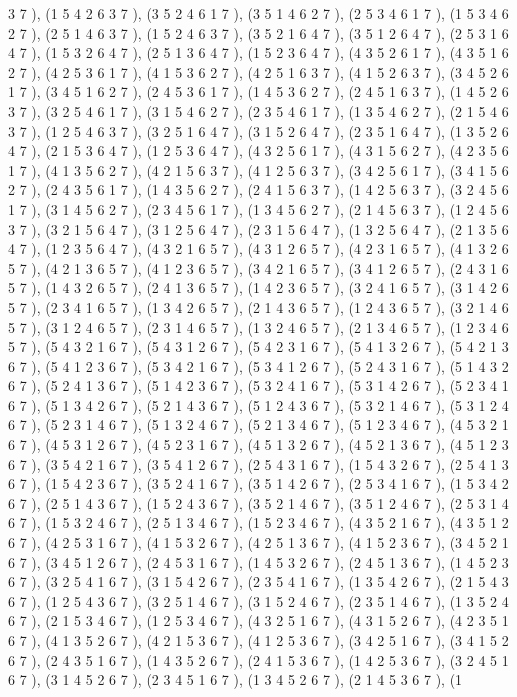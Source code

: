 \documentclass[12pt]{article}
\begin{document}
\begin{enumerate}
3 7  ), (1 5 4 2 6 3 7  ), (3 5 2 4 6 1 7  ), (3 5 1 4 6 2 7  ), (2 5 3 4 6 1 7  ), (1 5 3 4 6 2 7  ), (2 5 1 4 6 3 7  ), (1 5 2 4 6 3 7  ), (3 5 2 1 6 4 7  ), (3 5 1 2 6 4 7  ), (2 5 3 1 6 4 7  ), (1 5 3 2 6 4 7  ), (2 5 1 3 6 4 7  ), (1 5 2 3 6 4 7  ), (4 3 5 2 6 1 7  ), (4 3 5 1 6 2 7  ), (4 2 5 3 6 1 7  ), (4 1 5 3 6 2 7  ), (4 2 5 1 6 3 7  ), (4 1 5 2 6 3 7  ), (3 4 5 2 6 1 7  ), (3 4 5 1 6 2 7  ), (2 4 5 3 6 1 7  ), (1 4 5 3 6 2 7  ), (2 4 5 1 6 3 7  ), (1 4 5 2 6 3 7  ), (3 2 5 4 6 1 7  ), (3 1 5 4 6 2 7  ), (2 3 5 4 6 1 7  ), (1 3 5 4 6 2 7  ), (2 1 5 4 6 3 7  ), (1 2 5 4 6 3 7  ), (3 2 5 1 6 4 7  ), (3 1 5 2 6 4 7  ), (2 3 5 1 6 4 7  ), (1 3 5 2 6 4 7  ), (2 1 5 3 6 4 7  ), (1 2 5 3 6 4 7  ), (4 3 2 5 6 1 7  ), (4 3 1 5 6 2 7  ), (4 2 3 5 6 1 7  ), (4 1 3 5 6 2 7  ), (4 2 1 5 6 3 7  ), (4 1 2 5 6 3 7  ), (3 4 2 5 6 1 7  ), (3 4 1 5 6 2 7  ), (2 4 3 5 6 1 7  ), (1 4 3 5 6 2 7  ), (2 4 1 5 6 3 7  ), (1 4 2 5 6 3 7  ), (3 2 4 5 6 1 7  ), (3 1 4 5 6 2 7  ), (2 3 4 5 6 1 7  ), (1 3 4 5 6 2 7  ), (2 1 4 5 6 3 7  ), (1 2 4 5 6 3 7  ), (3 2 1 5 6 4 7  ), (3 1 2 5 6 4 7  ), (2 3 1 5 6 4 7  ), (1 3 2 5 6 4 7  ), (2 1 3 5 6 4 7  ), (1 2 3 5 6 4 7  ), (4 3 2 1 6 5 7  ), (4 3 1 2 6 5 7  ), (4 2 3 1 6 5 7  ), (4 1 3 2 6 5 7  ), (4 2 1 3 6 5 7  ), (4 1 2 3 6 5 7  ), (3 4 2 1 6 5 7  ), (3 4 1 2 6 5 7  ), (2 4 3 1 6 5 7  ), (1 4 3 2 6 5 7  ), (2 4 1 3 6 5 7  ), (1 4 2 3 6 5 7  ), (3 2 4 1 6 5 7  ), (3 1 4 2 6 5 7  ), (2 3 4 1 6 5 7  ), (1 3 4 2 6 5 7  ), (2 1 4 3 6 5 7  ), (1 2 4 3 6 5 7  ), (3 2 1 4 6 5 7  ), (3 1 2 4 6 5 7  ), (2 3 1 4 6 5 7  ), (1 3 2 4 6 5 7  ), (2 1 3 4 6 5 7  ), (1 2 3 4 6 5 7  ), (5 4 3 2 1 6 7  ), (5 4 3 1 2 6 7  ), (5 4 2 3 1 6 7  ), (5 4 1 3 2 6 7  ), (5 4 2 1 3 6 7  ), (5 4 1 2 3 6 7  ), (5 3 4 2 1 6 7  ), (5 3 4 1 2 6 7  ), (5 2 4 3 1 6 7  ), (5 1 4 3 2 6 7  ), (5 2 4 1 3 6 7  ), (5 1 4 2 3 6 7  ), (5 3 2 4 1 6 7  ), (5 3 1 4 2 6 7  ), (5 2 3 4 1 6 7  ), (5 1 3 4 2 6 7  ), (5 2 1 4 3 6 7  ), (5 1 2 4 3 6 7  ), (5 3 2 1 4 6 7  ), (5 3 1 2 4 6 7  ), (5 2 3 1 4 6 7  ), (5 1 3 2 4 6 7  ), (5 2 1 3 4 6 7  ), (5 1 2 3 4 6 7  ), (4 5 3 2 1 6 7  ), (4 5 3 1 2 6 7  ), (4 5 2 3 1 6 7  ), (4 5 1 3 2 6 7  ), (4 5 2 1 3 6 7  ), (4 5 1 2 3 6 7  ), (3 5 4 2 1 6 7  ), (3 5 4 1 2 6 7  ), (2 5 4 3 1 6 7  ), (1 5 4 3 2 6 7  ), (2 5 4 1 3 6 7  ), (1 5 4 2 3 6 7  ), (3 5 2 4 1 6 7  ), (3 5 1 4 2 6 7  ), (2 5 3 4 1 6 7  ), (1 5 3 4 2 6 7  ), (2 5 1 4 3 6 7  ), (1 5 2 4 3 6 7  ), (3 5 2 1 4 6 7  ), (3 5 1 2 4 6 7  ), (2 5 3 1 4 6 7  ), (1 5 3 2 4 6 7  ), (2 5 1 3 4 6 7  ), (1 5 2 3 4 6 7  ), (4 3 5 2 1 6 7  ), (4 3 5 1 2 6 7  ), (4 2 5 3 1 6 7  ), (4 1 5 3 2 6 7  ), (4 2 5 1 3 6 7  ), (4 1 5 2 3 6 7  ), (3 4 5 2 1 6 7  ), (3 4 5 1 2 6 7  ), (2 4 5 3 1 6 7  ), (1 4 5 3 2 6 7  ), (2 4 5 1 3 6 7  ), (1 4 5 2 3 6 7  ), (3 2 5 4 1 6 7  ), (3 1 5 4 2 6 7  ), (2 3 5 4 1 6 7  ), (1 3 5 4 2 6 7  ), (2 1 5 4 3 6 7  ), (1 2 5 4 3 6 7  ), (3 2 5 1 4 6 7  ), (3 1 5 2 4 6 7  ), (2 3 5 1 4 6 7  ), (1 3 5 2 4 6 7  ), (2 1 5 3 4 6 7  ), (1 2 5 3 4 6 7  ), (4 3 2 5 1 6 7  ), (4 3 1 5 2 6 7  ), (4 2 3 5 1 6 7  ), (4 1 3 5 2 6 7  ), (4 2 1 5 3 6 7  ), (4 1 2 5 3 6 7  ), (3 4 2 5 1 6 7  ), (3 4 1 5 2 6 7  ), (2 4 3 5 1 6 7  ), (1 4 3 5 2 6 7  ), (2 4 1 5 3 6 7  ), (1 4 2 5 3 6 7  ), (3 2 4 5 1 6 7  ), (3 1 4 5 2 6 7  ), (2 3 4 5 1 6 7  ), (1 3 4 5 2 6 7  ), (2 1 4 5 3 6 7  ), (1 
\end{enumerate}
\end{document}
